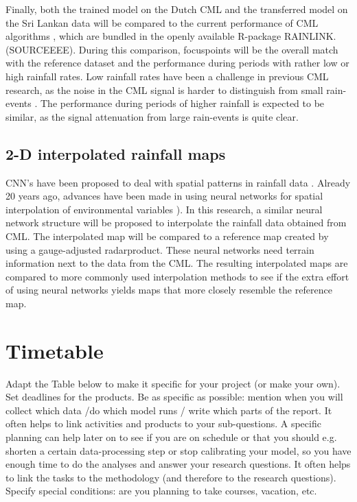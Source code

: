 \documentclass[twocolumn, 10pt, a4paper]{article}
\begin{document}
	Finally, both the trained model on the Dutch CML and the transferred model on the Sri Lankan data will be compared to the current performance of CML algorithms \cite{Overeem2011, Overeem2021}, which are bundled in the openly available R-package RAINLINK. (SOURCEEEE). During this comparison, focuspoints will be the overall match with the reference dataset and the performance during periods with rather low or high rainfall rates. Low rainfall rates have been a challenge in previous CML research, as the noise in the CML signal is harder to distinguish from small rain-events \cite{Uijlenhoet2018}. The performance during periods of higher rainfall is expected to be similar, as the signal attenuation from large rain-events is quite clear. 
	
	\subsection{2-D interpolated rainfall maps}
	CNN's have been proposed to deal with spatial patterns in rainfall data \cite{Sadeghi2019}. Already 20 years ago, advances have been made in using neural networks for spatial interpolation of environmental variables \cite{Rigol2001}). In this research, a similar neural network structure will be proposed to interpolate the rainfall data obtained from CML. The interpolated map will be compared to a reference map created by using a gauge-adjusted radarproduct.
	These neural networks need terrain information next to the data from the CML. The resulting interpolated maps are compared to more commonly used interpolation methods to see if the extra effort of using neural networks yields maps that more closely resemble the reference map. 
	
	
	\section{Timetable}
	
	Adapt the Table below to make it specific for your project (or make your own). Set deadlines for the products. Be as specific as possible: mention when you will collect which data /do which model runs / write which parts of the report. It often helps to link activities and products to your sub-questions. A specific planning can help later on to see if you are on schedule or that you should e.g. shorten a certain data-processing step or stop calibrating your model, so you have enough time to do the analyses and answer your research questions. It often helps to link the tasks to the methodology (and therefore to the research questions). Specify special conditions: are you planning to take courses, vacation, etc. 
	
\end{document}
